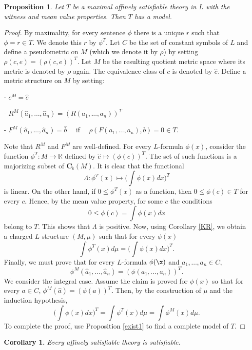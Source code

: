 \documentclass[12pt]{article}
\newtheorem{proposition}[theorem]{Proposition}
\newtheorem{corollary}[theorem]{Corollary}
\def\Rn{\mathbb R}
\begin{document}
\begin{proposition}\label{model construction}
Let $T$ be a maximal affinely satisfiable theory in $L$ with the witness and mean value properties. Then $T$ has a model.
\end{proposition}
\begin{proof}
By maximality, for every sentence $\phi$ there is a unique $r$ such that $\phi=r\in T$.
We denote this $r$ by $\phi^T$.
Let $C$ be the set of constant symbols of $L$ and define a pseudometric on $M$
(which we denote it by $\rho$) by setting $\rho(c,e)=(\rho(c,e))^T$.
Let $M$ be the resulting quotient metric space where its metric is denoted by $\rho$ again.
The equivalence class of $c$ is denoted by $\hat c$. Define a metric structure on $M$ by setting:

- $c^M=\hat c$

- $R^M(\hat a_1,...,\hat a_n)=(R(a_1,...,a_n))^T$

- $F^M(\hat a_1,...,\hat a_n)=\hat b$ \ \ if \ \ $\rho(F(a_1,...,a_n),b)=0\in T$.
\vspace{1mm}

Note that $R^M$ and $F^M$ are well-defined. For every $L$-formula $\phi(x)$,
consider the function $\phi^T:M\rightarrow\Rn$ defined by $\hat c\mapsto(\phi(c))^T$.
The set of such functions is a majorizing subset of $\mathbf{C}_b(M)$.
It is clear that the functional $$\Lambda:\phi^T(x)\mapsto\Big(\int\phi(x)dx\Big)^T$$ is linear.
On the other hand, if $0\leqslant\phi^T(x)$ as a function, then $0\leqslant\phi(c)\in T$ for every $c$.
Hence, by the mean value property, for some $c$ the conditions $$0\leqslant\phi(c)=\int\phi(x)dx$$ belong to $T$.
This shows that $\Lambda$ is positive.
Now, using Corollary \ref{KR}, we obtain a charged $L$-structure $(M,\mu)$ such that for every $\phi(x)$
$$\int\phi^T(x)d\mu=\Big(\int\phi(x)dx\Big)^T.$$
Finally, we must prove that for every $L$-formula $\phi(\x)$ and $a_1,...,a_n\in C$,
$$\phi^M(\hat a_1,...,\hat a_n)=(\phi(a_1,...,a_n))^T.$$
We consider the integral case. Assume the claim is proved for $\phi(x)$ so that
for every $a\in C$, $\phi^M(\hat a)=(\phi(a))^T$.
Then, by the construction of $\mu$ and the induction hypothesis,
$$\Big(\int\phi(x)dx\Big)^T=\int\phi^T(x)d\mu=\int\phi^M(x)d\mu.$$
To complete the proof, use Proposition \ref{exist1} to find a complete model of $T$. %
\end{proof}

\begin{corollary}
Every affinely satisfiable theory is satisfiable.
\end{corollary}
\end{document}

